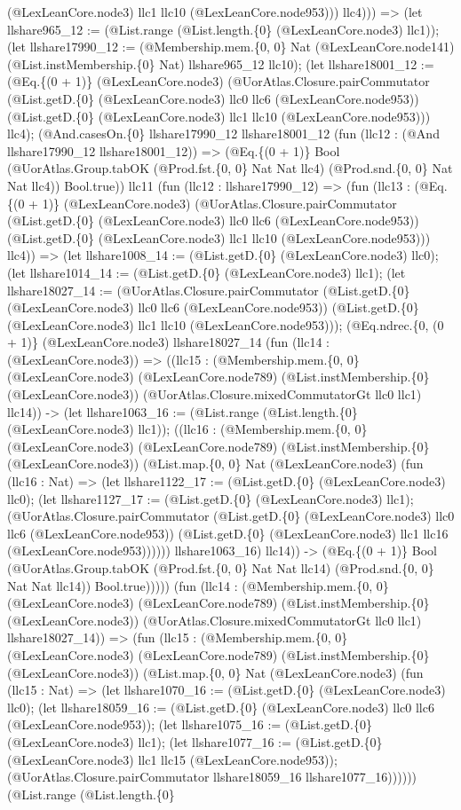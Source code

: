 \documentclass[11pt]{article}
\begin{document}
(@LexLeanCore.node3) llc1 llc10 (@LexLeanCore.node953))) llc4))) => (let llshare965\_12 := (@List.range (@List.length.\{0\} (@LexLeanCore.node3) llc1)); (let llshare17990\_12 := (@Membership.mem.\{0, 0\} Nat (@LexLeanCore.node141) (@List.instMembership.\{0\} Nat) llshare965\_12 llc10); (let llshare18001\_12 := (@Eq.\{(0 + 1)\} (@LexLeanCore.node3) (@UorAtlas.Closure.pairCommutator (@List.getD.\{0\} (@LexLeanCore.node3) llc0 llc6 (@LexLeanCore.node953)) (@List.getD.\{0\} (@LexLeanCore.node3) llc1 llc10 (@LexLeanCore.node953))) llc4); (@And.casesOn.\{0\} llshare17990\_12 llshare18001\_12 (fun (llc12 : (@And llshare17990\_12 llshare18001\_12)) => (@Eq.\{(0 + 1)\} Bool (@UorAtlas.Group.tabOK (@Prod.fst.\{0, 0\} Nat Nat llc4) (@Prod.snd.\{0, 0\} Nat Nat llc4)) Bool.true)) llc11 (fun (llc12 : llshare17990\_12) => (fun (llc13 : (@Eq.\{(0 + 1)\} (@LexLeanCore.node3) (@UorAtlas.Closure.pairCommutator (@List.getD.\{0\} (@LexLeanCore.node3) llc0 llc6 (@LexLeanCore.node953)) (@List.getD.\{0\} (@LexLeanCore.node3) llc1 llc10 (@LexLeanCore.node953))) llc4)) => (let llshare1008\_14 := (@List.getD.\{0\} (@LexLeanCore.node3) llc0); (let llshare1014\_14 := (@List.getD.\{0\} (@LexLeanCore.node3) llc1); (let llshare18027\_14 := (@UorAtlas.Closure.pairCommutator (@List.getD.\{0\} (@LexLeanCore.node3) llc0 llc6 (@LexLeanCore.node953)) (@List.getD.\{0\} (@LexLeanCore.node3) llc1 llc10 (@LexLeanCore.node953))); (@Eq.ndrec.\{0, (0 + 1)\} (@LexLeanCore.node3) llshare18027\_14 (fun (llc14 : (@LexLeanCore.node3)) => ((llc15 : (@Membership.mem.\{0, 0\} (@LexLeanCore.node3) (@LexLeanCore.node789) (@List.instMembership.\{0\} (@LexLeanCore.node3)) (@UorAtlas.Closure.mixedCommutatorGt llc0 llc1) llc14)) -> (let llshare1063\_16 := (@List.range (@List.length.\{0\} (@LexLeanCore.node3) llc1)); ((llc16 : (@Membership.mem.\{0, 0\} (@LexLeanCore.node3) (@LexLeanCore.node789) (@List.instMembership.\{0\} (@LexLeanCore.node3)) (@List.map.\{0, 0\} Nat (@LexLeanCore.node3) (fun (llc16 : Nat) => (let llshare1122\_17 := (@List.getD.\{0\} (@LexLeanCore.node3) llc0); (let llshare1127\_17 := (@List.getD.\{0\} (@LexLeanCore.node3) llc1); (@UorAtlas.Closure.pairCommutator (@List.getD.\{0\} (@LexLeanCore.node3) llc0 llc6 (@LexLeanCore.node953)) (@List.getD.\{0\} (@LexLeanCore.node3) llc1 llc16 (@LexLeanCore.node953)))))) llshare1063\_16) llc14)) -> (@Eq.\{(0 + 1)\} Bool (@UorAtlas.Group.tabOK (@Prod.fst.\{0, 0\} Nat Nat llc14) (@Prod.snd.\{0, 0\} Nat Nat llc14)) Bool.true))))) (fun (llc14 : (@Membership.mem.\{0, 0\} (@LexLeanCore.node3) (@LexLeanCore.node789) (@List.instMembership.\{0\} (@LexLeanCore.node3)) (@UorAtlas.Closure.mixedCommutatorGt llc0 llc1) llshare18027\_14)) => (fun (llc15 : (@Membership.mem.\{0, 0\} (@LexLeanCore.node3) (@LexLeanCore.node789) (@List.instMembership.\{0\} (@LexLeanCore.node3)) (@List.map.\{0, 0\} Nat (@LexLeanCore.node3) (fun (llc15 : Nat) => (let llshare1070\_16 := (@List.getD.\{0\} (@LexLeanCore.node3) llc0); (let llshare18059\_16 := (@List.getD.\{0\} (@LexLeanCore.node3) llc0 llc6 (@LexLeanCore.node953)); (let llshare1075\_16 := (@List.getD.\{0\} (@LexLeanCore.node3) llc1); (let llshare1077\_16 := (@List.getD.\{0\} (@LexLeanCore.node3) llc1 llc15 (@LexLeanCore.node953)); (@UorAtlas.Closure.pairCommutator llshare18059\_16 llshare1077\_16)))))) (@List.range (@List.length.\{0\} 
\end{document}
